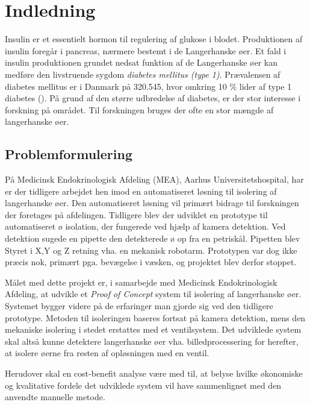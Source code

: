 \chapter{Indledning}
Insulin er et essentielt hormon til regulering af glukose i blodet. Produktionen af insulin foregår i pancreas, nærmere bestemt i de Langerhanske øer. Et fald i insulin produktionen grundet nedsat funktion af de Langerhanske øer kan medføre den livstruende sygdom \textit{diabetes mellitus (type 1)}. Prævalensen af diabetes mellitus er i Danmark på 320.545, hvor omkring 10 \% lider af type 1 diabetes (\cite{diabetes}). På grund af den større udbredelse af diabetes, er der stor interesse i forskning på området. Til forskningen bruges der ofte en stor mængde af langerhanske øer. 





\section{Problemformulering}
På Medicinsk Endokrinologisk Afdeling (MEA), Aarhus Universitetshospital, har er der tidligere arbejdet hen imod en automatiseret løsning til isolering af langerhanske øer. Den automatiseret løsning vil primært bidrage til forskningen der foretages på afdelingen. Tidligere blev der udviklet en prototype til automatiseret ø isolation, der fungerede ved hjælp af kamera detektion. Ved detektion sugede en pipette den detekterede ø op fra en petriskål. Pipetten blev Styret i X,Y og Z retning vha. en mekanisk robotarm. Prototypen var dog ikke præcis nok, primært pga. bevægelse i væsken, og projektet blev derfor stoppet.

Målet med dette projekt er, i samarbejde med Medicinsk Endokrinologisk Afdeling, at udvikle et \textit{Proof of Concept} system til isolering af langerhanske øer. Systemet bygger videre på de erfaringer man gjorde sig ved den tidligere prototype. Metoden til isoleringen baseres fortsat på kamera detektion, mens den mekaniske isolering i stedet erstattes med et ventilsystem. Det udviklede system skal altså kunne detektere langerhanske øer vha. billedprocessering for herefter, at isolere øerne fra resten af opløsningen med en ventil. 

Herudover skal en cost-benefit analyse være med til, at belyse hvilke økonomiske og kvalitative fordele det udviklede system vil have sammenlignet med den anvendte manuelle metode.

